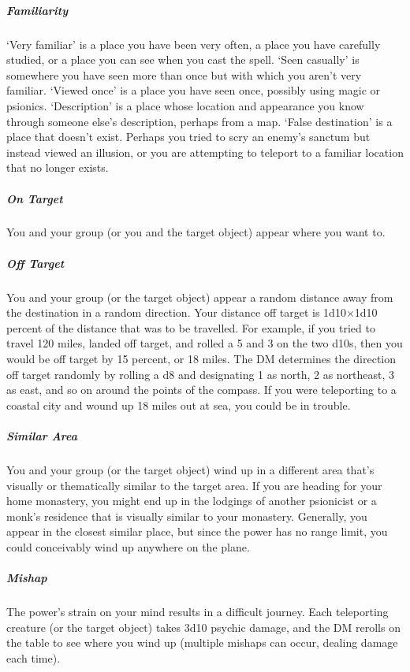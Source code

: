 \subparagraph{Familiarity}
  `Very familiar' is a place you have been very often,
  a place you have carefully studied,
  or a place you can see when you cast the spell.
  `Seen casually' is somewhere you have seen more than once
  but with which you aren't very familiar.
  `Viewed once' is a place you have seen once,
  possibly using magic or psionics.
  `Description' is a place whose location and appearance you know
  through someone else's description, perhaps from a map.
  `False destination' is a place that doesn't exist.
  Perhaps you tried to scry an enemy's sanctum
  but instead viewed an illusion,
  or you are attempting to teleport to a familiar location
  that no longer exists.

\subparagraph{On Target}
  You and your group (or you and the target object)
  appear where you want to.

\subparagraph{Off Target}
  You and your group (or the target object) appear a random distance away
  from the destination in a random direction.
  Your distance off target is 1d10$\times$1d10 percent of the distance
  that was to be travelled.
  For example, if you tried to travel 120 miles,
  landed off target,
  and rolled a 5 and 3 on the two d10s,
  then you would be off target by 15 percent, or 18 miles.
  The DM determines the direction off target randomly
  by rolling a d8 and designating
  1 as north,
  2 as northeast,
  3 as east,
  and so on around the points of the compass.
  If you were teleporting to a coastal city and wound up 18 miles out at sea,
  you could be in trouble.

\subparagraph{Similar Area}
  You and your group (or the target object) wind up in a different area
  that's visually or thematically similar to the target area.
  If you are heading for your home monastery,
  you might end up in the lodgings of another psionicist
  or a monk's residence that is visually similar to your monastery.
  Generally, you appear in the closest similar place,
  but since the power has no range limit,
  you could conceivably wind up anywhere on the plane.

\subparagraph{Mishap}
  The power's strain on your mind results in a difficult journey.
  Each teleporting creature (or the target object) takes 3d10 psychic damage,
  and the DM rerolls on the table to see where you wind up
  (multiple mishaps can occur, dealing damage each time).

